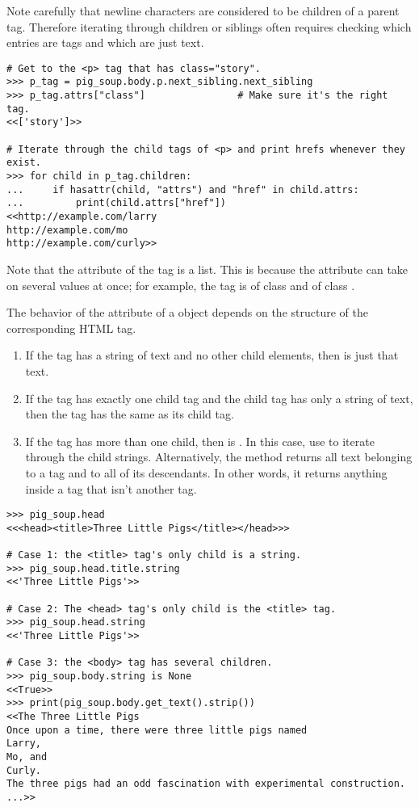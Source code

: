 Note carefully that newline characters are considered to be children of a parent tag.
Therefore iterating through children or siblings often requires checking which entries are tags and which are just text.

\begin{lstlisting}
# Get to the <p> tag that has class="story".
>>> p_tag = pig_soup.body.p.next_sibling.next_sibling
>>> p_tag.attrs["class"]                # Make sure it's the right tag.
<<['story']>>

# Iterate through the child tags of <p> and print hrefs whenever they exist.
>>> for child in p_tag.children:
...     if hasattr(child, "attrs") and "href" in child.attrs:
...         print(child.attrs["href"])
<<http://example.com/larry
http://example.com/mo
http://example.com/curly>>
\end{lstlisting}

Note that the  attribute of the  tag is a list.
This is because the  attribute can take on several values at once; for example, the tag  is of class  and of class .

The behavior of the  attribute of a  object depends on the structure of the corresponding HTML tag.
\begin{enumerate}
    \item If the tag has a string of text and no other child elements, then  is just that text.
    \item If the tag has exactly one child tag and the child tag has only a string of text, then the tag has the same  as its child tag.
    \item If the tag has more than one child, then  is .
    In this case, use  to iterate through the child strings.
    Alternatively, the  method returns all text belonging to a tag and to all of its descendants.
    In other words, it returns anything inside a tag that isn't another tag.
\end{enumerate}

\begin{lstlisting}
>>> pig_soup.head
<<<head><title>Three Little Pigs</title></head>>>

# Case 1: the <title> tag's only child is a string.
>>> pig_soup.head.title.string
<<'Three Little Pigs'>>

# Case 2: The <head> tag's only child is the <title> tag.
>>> pig_soup.head.string
<<'Three Little Pigs'>>

# Case 3: the <body> tag has several children.
>>> pig_soup.body.string is None
<<True>>
>>> print(pig_soup.body.get_text().strip())
<<The Three Little Pigs
Once upon a time, there were three little pigs named
Larry,
Mo, and
Curly.
The three pigs had an odd fascination with experimental construction.
...>>
\end{lstlisting}

